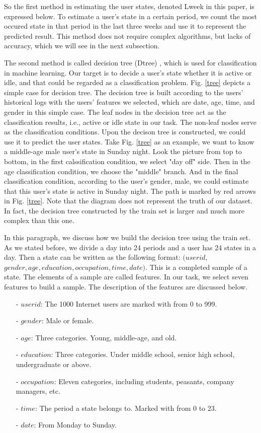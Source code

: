 \documentclass[journal]{IEEEtran}
\begin{document}
So the first method in estimating the user states, denoted Lweek in this paper, is expressed below. To estimate a user's state in a certain period, we count the most occured state in that period in the last three weeks and use it to represent the predicted result. This method does not require complex algorithms, but lacks of accuracy, which we will see in the next subsection.

The second method is called decision tree (Dtree) \cite{Kotsiantis2013}, which is used for classification in machine learning. Our target is to decide a user's state whether it is active or idle, and that could be regarded as a classification problem. Fig. \ref{tree} depicts a simple case for decision tree. The decision tree is built according to the users' historical logs with the users' features we selected, which are date, age, time, and gender in this simple case. The leaf nodes in the decision tree act as the classification results, i.e., active or idle state in our task. The non-leaf nodes serve as the classification conditions. Upon the decison tree is constructed, we could use it to predict the user states. Take Fig. \ref{tree} as an example, we want to know a middle-age male user's state in Sunday night. Look the picture from top to bottom, in the first calssification condition, we select "day off" side. Then in the age classification condition, we choose the "middle" branch. And in the final classification condition, according to the user's gender, male, we could estimate that this user's state is active in Sunday night. The path is marked by red arrows in Fig. \ref{tree}. Note that the diagram does not represent the truth of our dataset. In fact, the decision tree constructed by the train set is larger and much more complex than this one. 

In this paragraph, we discuss how we build the decision tree using the train set. As we stated before, we divide a day into 24 periods and a user has 24 states in a day. Then a state can be written as the following format: $(user$\textunderscore $id$, $gender, age, education, occupation, time, date)$. This is a completed sample of a state. The elements of a sample are called features. In our task, we select seven features to build a sample. The description of the features are discussed below.

\begin{itemize}
  \item[-] $user$\textunderscore $id$: The 1000 Internet users are marked with from 0 to 999.
  \item[-] $gender$: Male or female.
  \item[-] $age$: Three categories. Young, middle-age, and old.
  \item[-] $education$: Three categories. Under middle school, senior high school, undergraduate or above.
  \item[-] $occupation$: Eleven categories, including students, peasants, company managers, etc.
  \item[-] $time$: The period a state belongs to. Marked with from 0 to 23.
  \item[-] $date$: From Monday to Sunday.
\end{itemize}
\end{document}
